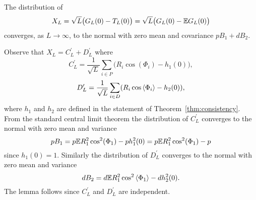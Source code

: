 \documentclass[journal]{IEEEtran}
\begin{document}



\begin{lemma}\label{lem:XL} 
The distribution of 
\[
X_L = \sqrt{L} \big( G_L(0) - T_L(0) \big) = \sqrt{L} \big( G_L(0) - {\mathbb E} G_L(0) \big)
\] 
converges, as $L \rightarrow\infty$,  to the normal with zero mean and covariance $pB_1 + d B_2.$
\end{lemma}
\begin{IEEEproof}
Observe that $X_L = C_L^\prime + D_L^\prime$ where
\[
C_L^\prime = \frac{1}{\sqrt{L}} \sum_{i \in P} \big( R_i \cos(\Phi_i) - h_1(0) \big),
\]
\[
D_L^\prime = \frac{1}{\sqrt{L}} \sum_{i \in D} (R_i \cos\left\langle \Phi_i \right\rangle - h_2(0) ),
\]
where $h_1$ and $h_2$ are defined in the statement of Theorem~\ref{thm:consistency}.  From the standard central limit theorem the distribution of $C_L^\prime$ converges to the normal with zero mean and variance
\[
p B_1 = p {\mathbb E} R_1^2 \cos^2(\Phi_1) - p h_1^2(0) =  p {\mathbb E} R_1^2 \cos^2(\Phi_1) - p 
\]
since $h_1(0) = 1$.  Similarly the distribution of $D_L^\prime$ converges to the normal with zero mean and variance
\[
d B_2 = d {\mathbb E} R_1^2 \cos^2\left\langle \Phi_1 \right\rangle - d h_2^2(0).
\]
The lemma follows since $C_L^\prime$ and $D_L^\prime$ are independent.
\end{IEEEproof}
\end{document}
